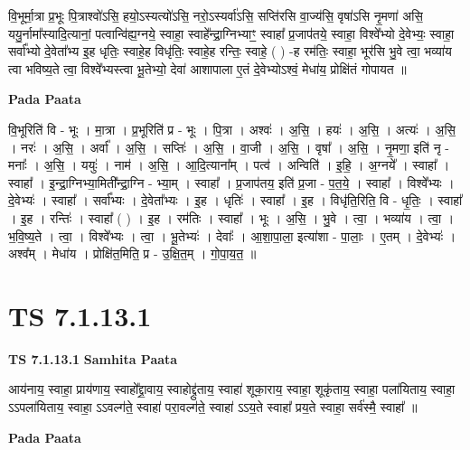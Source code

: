 \documentclass[17pt]{extarticle}
\begin{document}
वि॒भूर्मा॒त्रा प्र॒भूः पि॒त्राश्वो॑ऽसि॒ हयो॒ऽस्यत्यो॑ऽसि॒ नरो॒ऽस्यर्वा॑ऽसि॒ सप्ति॑रसि वा॒ज्य॑सि॒ वृषा॑ऽसि नृ॒मणा॑ असि॒ ययु॒र्नामा᳚स्यादि॒त्यानां॒ पत्वान्वि॑ह्य॒ग्नये॒ स्वाहा॒ स्वाहे᳚न्द्रा॒ग्निभ्याꣳ॒॒ स्वाहा᳚ प्र॒जाप॑तये॒ स्वाहा॒ विश्वे᳚भ्यो दे॒वेभ्यः॒ स्वाहा॒ सर्वा᳚भ्यो दे॒वेता᳚भ्य इ॒ह धृतिः॒ स्वाहे॒ह विधृ॑तिः॒ स्वाहे॒ह रन्तिः॒ स्वाहे॒ ( ) -ह रम॑तिः॒ स्वाहा॒ भूर॑सि भु॒वे त्वा॒ भव्या॑य त्वा भविष्य॒ते त्वा॒ विश्वे᳚भ्यस्त्वा भू॒तेभ्यो॒ देवा॑ आशापाला ए॒तं दे॒वेभ्योऽश्वं॒ मेधा॑य॒ प्रोक्षि॑तं गोपायत ॥ \newline

\textbf{Pada Paata} \newline

वि॒भूरिति॑ वि - भूः । मा॒त्रा । प्र॒भूरिति॑ प्र - भूः । पि॒त्रा । अश्वः॑ । अ॒सि॒ । हयः॑ । अ॒सि॒ । अत्यः॑ । अ॒सि॒ । नरः॑ । अ॒सि॒ । अर्वा᳚ । अ॒सि॒ । सप्तिः॑ । अ॒सि॒ । वा॒जी । अ॒सि॒ । वृषा᳚ । अ॒सि॒ । नृ॒मणा॒ इति॑ नृ - मनाः᳚ । अ॒सि॒ । ययुः॑ । नाम॑ । अ॒सि॒ । आ॒दि॒त्याना᳚म् । पत्व॑ । अन्विति॑ । इ॒हि॒ । अ॒ग्नये᳚ । स्वाहा᳚ । स्वाहा᳚ । इ॒न्द्रा॒ग्निभ्या॒मिती᳚न्द्रा॒ग्नि - भ्या॒म् । स्वाहा᳚ । प्र॒जाप॑तय॒ इति॑ प्र॒जा - प॒त॒ये॒ । स्वाहा᳚ । विश्वे᳚भ्यः । दे॒वेभ्यः॑ । स्वाहा᳚ । सर्वा᳚भ्यः । दे॒वेता᳚भ्यः । इ॒ह । धृतिः॑ । स्वाहा᳚ । इ॒ह । विधृ॑ति॒रिति॒ वि - धृ॒तिः॒ । स्वाहा᳚ । इ॒ह । रन्तिः॑ । स्वाहा᳚ ( ) । इ॒ह । रम॑तिः । स्वाहा᳚ । भूः । अ॒सि॒ । भु॒वे । त्वा॒ । भव्या॑य । त्वा॒ । भ॒वि॒ष्य॒ते । त्वा॒ । विश्वे᳚भ्यः । त्वा॒ । भू॒तेभ्यः॑ । देवाः᳚ । आ॒शा॒पा॒ला॒ इत्या॑शा - पा॒लाः॒ । ए॒तम् । दे॒वेभ्यः॑ । अश्व᳚म् । मेधा॑य । प्रोक्षि॑त॒मिति॒ प्र - उ॒क्षि॒त॒म् । गो॒पा॒य॒त॒ ॥  \newline




\section*{ TS 7.1.13.1 }

\textbf{TS 7.1.13.1 } \newline
\textbf{Samhita Paata} \newline

आय॑नाय॒ स्वाहा॒ प्राय॑णाय॒ स्वाहो᳚द्द्रा॒वाय॒ स्वाहोद्द्रु॑ताय॒ स्वाहा॑ शूका॒राय॒ स्वाहा॒ शूकृ॑ताय॒ स्वाहा॒ पला॑यिताय॒ स्वाहा॒ ऽऽपला॑यिताय॒ स्वाहा॒ ऽऽवल्ग॑ते॒ स्वाहा॑ परा॒वल्ग॑ते॒ स्वाहा॑ ऽऽय॒ते स्वाहा᳚ प्रय॒ते स्वाहा॒ सर्व॑स्मै॒ स्वाहा᳚ ॥ \newline

\textbf{Pada Paata} \newline
\end{document}
